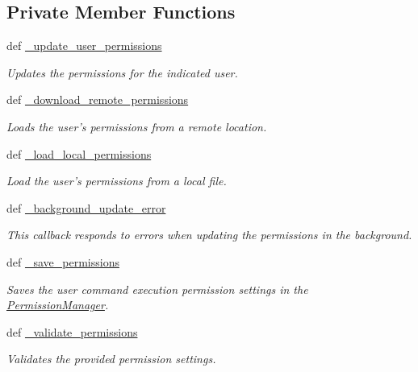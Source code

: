 \subsection*{Private Member Functions}
\begin{DoxyCompactItemize}
\item 
def \hyperlink{classhwm_1_1network_1_1security_1_1permissions_1_1_permission_manager_ad89fa81a774d6ce3374f1099056f8030}{\-\_\-update\-\_\-user\-\_\-permissions}
\begin{DoxyCompactList}\small\item\em Updates the permissions for the indicated user. \end{DoxyCompactList}\item 
def \hyperlink{classhwm_1_1network_1_1security_1_1permissions_1_1_permission_manager_a2364f905e94b6fd6e7592c00fe848aed}{\-\_\-download\-\_\-remote\-\_\-permissions}
\begin{DoxyCompactList}\small\item\em Loads the user's permissions from a remote location. \end{DoxyCompactList}\item 
def \hyperlink{classhwm_1_1network_1_1security_1_1permissions_1_1_permission_manager_a2a28289c571a99136961b110e568fdd3}{\-\_\-load\-\_\-local\-\_\-permissions}
\begin{DoxyCompactList}\small\item\em Load the user's permissions from a local file. \end{DoxyCompactList}\item 
def \hyperlink{classhwm_1_1network_1_1security_1_1permissions_1_1_permission_manager_a7bd6749086c0532ebfbe7aca4d486851}{\-\_\-background\-\_\-update\-\_\-error}
\begin{DoxyCompactList}\small\item\em This callback responds to errors when updating the permissions in the background. \end{DoxyCompactList}\item 
def \hyperlink{classhwm_1_1network_1_1security_1_1permissions_1_1_permission_manager_aa0eb5cbf78502874d25842efecbecd6f}{\-\_\-save\-\_\-permissions}
\begin{DoxyCompactList}\small\item\em Saves the user command execution permission settings in the \hyperlink{classhwm_1_1network_1_1security_1_1permissions_1_1_permission_manager}{Permission\-Manager}. \end{DoxyCompactList}\item 
def \hyperlink{classhwm_1_1network_1_1security_1_1permissions_1_1_permission_manager_ab4f252a76fcaa6f4778045a13eae42a3}{\-\_\-validate\-\_\-permissions}
\begin{DoxyCompactList}\small\item\em Validates the provided permission settings. \end{DoxyCompactList}\end{DoxyCompactItemize}


